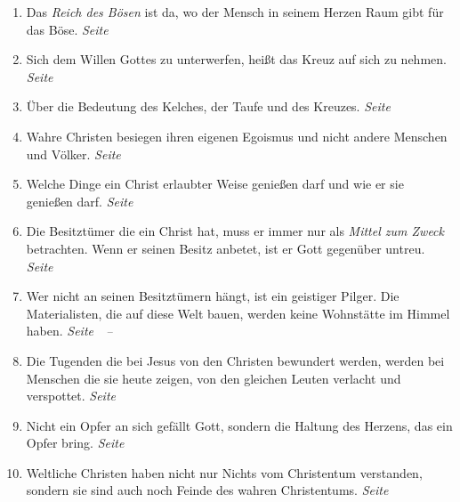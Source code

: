 \begin{enumerate}
 \item Das \textit{Reich des Bösen} ist da, wo der Mensch in seinem Herzen Raum
gibt für das Böse.
 \dotfill \textit{Seite~\pageref{ref:03_04_reich_des_boesen}}\\

 \item Sich dem Willen Gottes zu unterwerfen, heißt das Kreuz auf sich zu
nehmen.
 \dotfill \textit{Seite
\pageref{ref:03_05_kreuz_auf_sich_nehmen}}\\

 \item Über die Bedeutung des Kelches, der Taufe und des Kreuzes.
 \dotfill \textit{Seite
\pageref{ref:04_04_kelch_taufe_kreuz}}\\

 \item Wahre Christen besiegen ihren eigenen Egoismus und nicht andere Menschen
und Völker.
 \dotfill \textit{Seite~\pageref{ref:04_05_besigen}}\\

 \item Welche Dinge ein Christ erlaubter Weise genießen darf und wie er sie
genießen darf.
 \dotfill \textit{Seite~\pageref{ref:04_07_vorteile}}\\

 \item Die Besitztümer die ein Christ hat, muss er immer nur als \textit{Mittel
zum Zweck} betrachten. Wenn er seinen Besitz anbetet, ist er Gott gegenüber
untreu.
 \dotfill \textit{Seite~\pageref{ref:04_07_vorteile}}\\

 \item Wer nicht an seinen Besitztümern hängt, ist ein geistiger Pilger. Die
Materialisten, die auf diese Welt bauen, werden keine Wohnstätte im Himmel
haben.
 \dotfill
 \textit{Seite~\pageref{ref:04_10_pilger}~--~\pageref{ref:04_10_pilger_ende}}\\

 \item Die Tugenden die bei Jesus von den Christen bewundert werden, werden bei
Menschen die sie heute zeigen, von den gleichen Leuten verlacht und verspottet.
 \dotfill \textit{Seite~\pageref{ref:04_10_pilger}}\\
 \item Nicht ein Opfer an sich gefällt Gott, sondern die Haltung des Herzens, das
ein Opfer bring.
 \dotfill \textit{Seite~\pageref{ref:04_13_opfer}}\\
 \item Weltliche Christen haben nicht nur Nichts vom Christentum verstanden,
sondern sie sind auch noch Feinde des wahren Christentums.
 \dotfill \textit{Seite
\pageref{ref:04_13_weltliche_christen}}\\


\end{enumerate}
